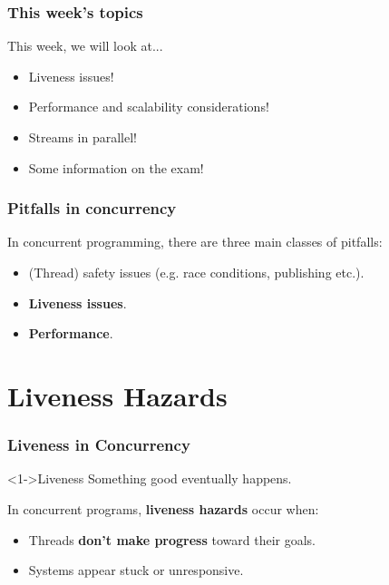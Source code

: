 \documentclass[xcolor={dvipsnames,svgnames},aspectratio=169]{beamer}
\begin{document}
\begin{frame}[fragile]
  \frametitle{This week's topics}

  This week, we will look at...

  \begin{itemize}
  \item[\faBook]<1-> Liveness issues!
  \item[\faBook]<1-> Performance and scalability considerations!
  \item[\faBook]<1-> Streams in parallel!
  \item[\faBook]<1-> Some information on the exam!
  \end{itemize}
\end{frame}

\begin{frame}[fragile]
  \frametitle{Pitfalls in concurrency}

  In concurrent programming, there are three main classes of pitfalls:

  \begin{itemize}
  \item[\faUserInjured]<1-> (Thread) safety issues (e.g. race conditions,
    publishing etc.).
  \item[\faUserInjured]<2-> \textbf{Liveness issues}.
  \item[\faUserInjured]<3-> \textbf{Performance}.
  \end{itemize}

\end{frame}

\section{Liveness Hazards}



\begin{frame}[fragile]
  \frametitle{Liveness in Concurrency}

  \begin{block}<1->{\faSearch \quad Liveness}
    Something good eventually happens.
  \end{block}

  In concurrent programs, \textbf{liveness hazards} occur when:

  \begin{itemize}
  \item[\faUserInjured]<1-> Threads \textbf{don't make progress} toward their
    goals.
  \item[\faUserInjured]<1-> Systems appear stuck or unresponsive.
  \end{itemize}
\end{frame}
\end{document}
